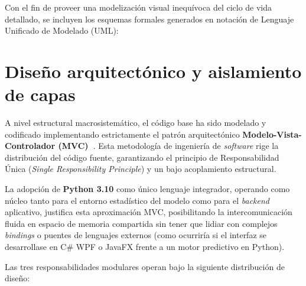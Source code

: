 Con el fin de proveer una modelización visual inequívoca del ciclo de vida detallado, se incluyen los esquemas formales generados en notación de Lenguaje Unificado de Modelado (UML):

\clearpage
{}

\section{Diseño arquitectónico y aislamiento de capas}

A nivel estructural macrosistemático, el código base ha sido modelado y codificado implementando estrictamente el patrón arquitectónico \textbf{Modelo-Vista-Controlador (MVC)~\cite{gamma1994design}}. Esta metodología de ingeniería de \textit{software} rige la distribución del código fuente, garantizando el principio de Responsabilidad Única (\textit{Single Responsibility Principle}) y un bajo acoplamiento estructural. 

La adopción de \textbf{Python 3.10} como único lenguaje integrador, operando como núcleo tanto para el entorno estadístico del modelo como para el \textit{backend} aplicativo, justifica esta aproximación MVC, posibilitando la intercomunicación fluida en espacio de memoria compartida sin tener que lidiar con complejos \textit{bindings} o puentes de lenguajes externos (como ocurriría si el interfaz se desarrollase en C\# WPF o JavaFX frente a un motor predictivo en Python).

Las tres responsabilidades modulares operan bajo la siguiente distribución de diseño:

